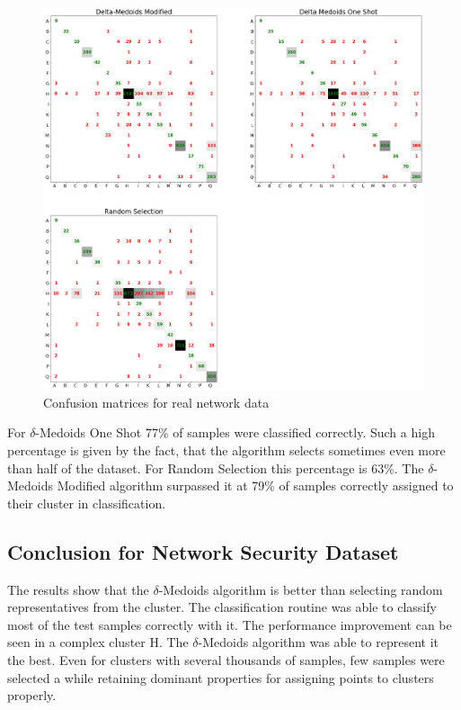 \documentclass[thesis=B,english]{FITthesis}[2012/10/20]
\begin{document}
\begin{figure}[t]
   \includegraphics[width=\linewidth]{img/exp4.png}
  \caption{Confusion matrices for real network data}
  \label{img:exp4}
\end{figure}

For $\delta$-Medoids One Shot 77\% of samples were classified correctly.
Such a high percentage is given by the fact, that the algorithm selects sometimes even more than half of the dataset.
For Random Selection this percentage is 63\%.
The $\delta$-Medoids Modified algorithm surpassed it at 79\% of samples correctly assigned to their cluster in classification.

\subsection{Conclusion for Network Security Dataset}
The results show that the $\delta$-Medoids algorithm is better than selecting random representatives from the cluster.
The classification routine was able to classify most of the test samples correctly with it.
The performance improvement can be seen in a complex cluster H.
The $\delta$-Medoids algorithm was able to represent it the best.
Even for clusters with several thousands of samples, few samples were selected a while retaining dominant properties for assigning points to clusters properly.
\end{document}

